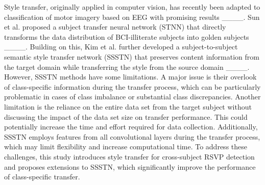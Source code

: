 Style transfer, originally applied in computer vision, has recently been adapted to classification of motor imagery based on EEG with promising results ____. Sun et al. proposed a subject transfer neural network (STNN) that directly transforms the data distribution of BCI-illiterate subjects into golden subjects ____. Building on this, Kim et al. further developed a subject-to-subject semantic style transfer network (SSSTN) that preserves content information from the target domain while transferring the style from the source domain ____. However, SSSTN methods have some limitations. A major issue is their overlook of class-specific information during the transfer process, which can be particularly problematic in cases of class imbalance or substantial class discrepancies. Another limitation is the reliance on the entire data set from the target subject without discussing the impact of the data set size on transfer performance. This could potentially increase the time and effort required for data collection. Additionally, SSSTN employs features from all convolutional layers during the transfer process, which may limit flexibility and increase computational time. To address these challenges, this study introduces style transfer for cross-subject RSVP detection and proposes extensions to SSSTN, which significantly improve the performance of class-specific transfer.